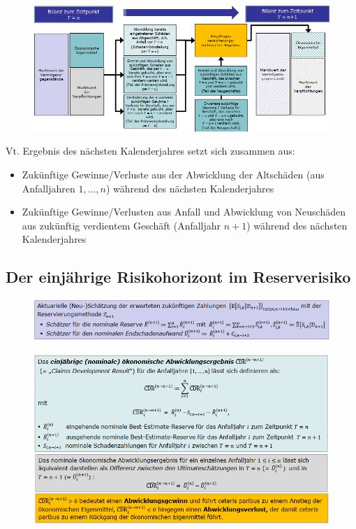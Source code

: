 \documentclass[12pt]{report}
\theoremstyle{dotless}
\theoremstyle{definition}
\begin{document}
\begin{figure}[ht]
	\centering
	\includegraphics[width= \textwidth]{Bilder/Kalendersicht2.png}
\end{figure}


Vt. Ergebnis des nächsten Kalenderjahres setzt sich zusammen aus:
\begin{itemize}
\item Zukünftige Gewinne/Verluste aus der Abwicklung der Altschäden (aus
Anfalljahren $1, …, n$) während des nächsten Kalenderjahres
\item Zukünftige Gewinne/Verlusten aus Anfall und Abwicklung von Neuschäden aus
zukünftig verdientem Geschäft (Anfalljahr $n+1$) während des nächsten
Kalenderjahres
\end{itemize}


\subsection{Der einjährige Risikohorizont im Reserverisiko}
\begin{figure}[ht]
	\centering
	\includegraphics[width= \textwidth]{Bilder/Schaetzer2.png}
\end{figure}

\begin{figure}[ht]
	\centering
	\includegraphics[width= \textwidth]{Bilder/AbwErg.png}
\end{figure}
\end{document}
